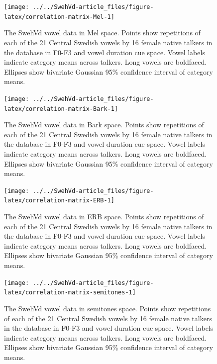 \documentclass[utf8]{frontiers_suppmat} %
\begin{document}
\begin{figure}
\texttt{[image: ../../SwehVd-article\_files/figure-latex/correlation-matrix-Mel-1]} \caption{The SwehVd vowel data in Mel space. Points show repetitions of each of the 21 Central Swedish vowels by 16 female native talkers in the database in F0-F3 and vowel duration cue space. Vowel labels indicate category means across talkers. Long vowels are boldfaced. Ellipses show bivariate Gaussian 95\% confidence interval of category means.}\label{fig:correlation-matrix-Mel}
\end{figure}



\begin{figure}
\texttt{[image: ../../SwehVd-article\_files/figure-latex/correlation-matrix-Bark-1]} \caption{The SwehVd vowel data in Bark space. Points show repetitions of each of the 21 Central Swedish vowels by 16 female native talkers in the database in F0-F3 and vowel duration cue space. Vowel labels indicate category means across talkers. Long vowels are boldfaced. Ellipses show bivariate Gaussian 95\% confidence interval of category means.}\label{fig:correlation-matrix-Bark}
\end{figure}



\begin{figure}
\texttt{[image: ../../SwehVd-article\_files/figure-latex/correlation-matrix-ERB-1]} \caption{The SwehVd vowel data in ERB space. Points show repetitions of each of the 21 Central Swedish vowels by 16 female native talkers in the database in F0-F3 and vowel duration cue space. Vowel labels indicate category means across talkers. Long vowels are boldfaced. Ellipses show bivariate Gaussian 95\% confidence interval of category means.}\label{fig:correlation-matrix-ERB}
\end{figure}



\begin{figure}
\texttt{[image: ../../SwehVd-article\_files/figure-latex/correlation-matrix-semitones-1]} \caption{The SwehVd vowel data in semitones space. Points show repetitions of each of the 21 Central Swedish vowels by 16 female native talkers in the database in F0-F3 and vowel duration cue space. Vowel labels indicate category means across talkers. Long vowels are boldfaced. Ellipses show bivariate Gaussian 95\% confidence interval of category means.}\label{fig:correlation-matrix-semitones}
\end{figure}
\end{document}

